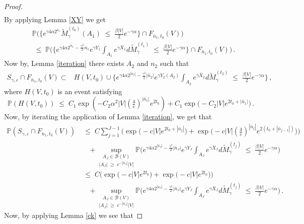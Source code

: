 \documentclass[11pt]{article}
\numberwithin{equation}{section}
\theoremstyle{definition}
\renewcommand{\tilde}{\widetilde}          %
\renewcommand{\leq}{\;\leqslant\;}                   %
\renewcommand{\geq}{\;\geqslant\;}                   %
\renewcommand{\P}{\mathbb{P}}
\def\eps{\varepsilon}
\newcommand{\ab}{|}
\newcommand{\sd}{S_{\gamma,\eps}}
\newcommand{\Pb}{\P}
\begin{document}
\begin{proof}
\begin{align*}
\end{align*}
By applying Lemma \ref{XY} we get 
\begin{align*}
&\Pb \big( \big\{  e^{\gamma 4 \alpha 2^{n_1}} \tilde M_\gamma^{(t_0)}(A_1) \leq \tfrac{\beta |V|}{2}  e^{-\gamma \alpha} \big\} \cap F_{\bar n_1, t_0}(V) \big) \\
&\leq \Pb \big( \big\{ e^{\gamma 4 \alpha  2^{n_1} - \frac{\gamma^2}{2} n_1}  e^{\gamma Y_1  } \int_{A_1} e^{\gamma \bar X_1} d \tilde M_\gamma^{(t_1)} \leq \tfrac{\beta |V|}{2}  e^{-\gamma \alpha} \big\} \cap F_{\bar n_1, t_0}(V) \big)\,.
\end{align*}
Now by, Lemma \ref{iteration} there exists $A_2$ and $n_2$ such that 
\begin{align*}
  \sd \cap F_{\bar n_1, t_0}(V)
  \subset& H(V,t_0) \cup  \{ e^{\gamma 4 \alpha 2^{| \bar n_{2} | }  - \frac{\gamma^2}{2} |\bar n_{2}| } e^{\gamma Y_{2}(A_{2})}\int_{A_{2}} e^{\gamma \bar X_{2}} d \tilde M_\gamma^{(t_{2})}\leq \tfrac{\beta \ab V \ab }{2} e^{-\gamma \alpha} \}\,,
  \end{align*}
  where   $H(V,t_0)$ is an event satisfying
\[
    \Pb (H(V,t_0)) \leq C_1 \exp(-C_2 \alpha^2 \ab V \ab  (\tfrac{4}{e})^{| \bar n_1|} e^{2t_{0}}) +  C_1 \exp \big( -C_2 \ab V \ab  e^{2 t_0 + | \bar n_{1}|} \big) \,.
\]
Now, by iterating  the application of Lemma \ref{iteration}, we get that 
\begin{align*}
\Pb(\sd \cap F_{\bar n_1, t_0}(V) ) &\leq C  \sum_{j=1}^{J-1}  \Big( \exp \big( -c \ab V \ab  e^{2t_0 + |\bar n_j|} \big) + \exp \big( -c \ab V \ab  (\tfrac{4}{e})^{\ab \bar n_j \ab }e^{2(t_0 + \ab \bar n_{j-1} \ab )}  \big)  \Big) \\
& \quad + \underset{|A_J| \geq e^{- \ab \bar n_J \ab } \ab V \ab  }{\sup_{A_J \in \mathcal{B}(V)}}  \Pb \big(  e^{\gamma 4 \alpha 2^{|\bar n_J|} - \frac{\gamma^2}{2} | \bar n_J|}  e^{\gamma Y_J  } \int_{A_J} e^{\gamma \bar X_J} d \tilde M_\gamma^{(t_j)} \leq \tfrac{\beta|V|}{2}  e^{-\gamma \alpha} \big) \\
& \leq C \Big( \exp \big( -c \ab V \ab   e^{2t_0 } \big) + \exp \big( -c \ab V \ab  e^{2t_0}  \big)  \Big) \\
& \quad + \underset{|A_J| \geq e^{- \ab \bar n_J \ab } \ab V \ab  }{\sup_{A_J \in \mathcal{B}(V)}}  \Pb \big(  e^{\gamma 4 \alpha 2^{|\bar n_J|} - \frac{\gamma^2}{2} | \bar n_J|}  e^{\gamma Y_J  } \int_{A_J} e^{\gamma \bar X_J} d \tilde M_\gamma^{(t_j)} \leq \tfrac{\beta|V|}{2}  e^{-\gamma \alpha} \big)\,.
\end{align*}
Now, by applying Lemma \ref{ck} we see that 

\end{proof}
\end{document}
